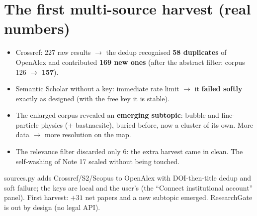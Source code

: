 \documentclass[11pt,a4paper]{article}
\begin{document}
\section{The first multi-source harvest (real numbers)}

\begin{itemize}
  \item Crossref: 227 raw results $\rightarrow$ the dedup recognised \textbf{58 duplicates} of
        OpenAlex and contributed \textbf{169 new ones} (after the abstract filter: corpus 126
        $\rightarrow$ \textbf{157}).
  \item Semantic Scholar without a key: immediate rate limit $\rightarrow$ it \textbf{failed
        softly} exactly as designed (with the free key it is stable).
  \item The enlarged corpus revealed an \textbf{emerging subtopic}: bubble and fine-particle
        physics ($+$ bastnaesite), buried before, now a cluster of its own. More data
        $\rightarrow$ more resolution on the map.
  \item The relevance filter discarded only 6: the extra harvest came in clean. The
        self-washing of Note 17 scaled without being touched.
\end{itemize}

\begin{resumen}
sources.py adds Crossref/S2/Scopus to OpenAlex with DOI-then-title dedup and soft failure; the
keys are local and the user's (the ``Connect institutional account'' panel). First harvest:
$+31$ net papers and a new subtopic emerged. ResearchGate is out by design (no legal API).
\end{resumen}
\end{document}
